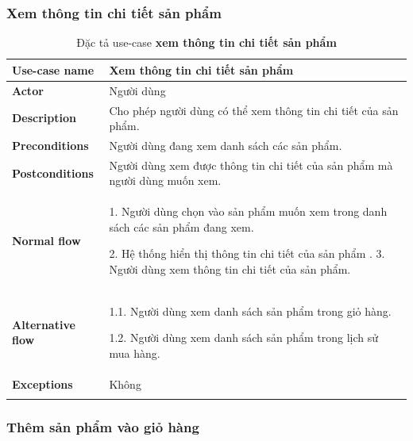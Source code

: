     \subsubsection{Xem thông tin chi tiết sản phẩm } 
         \begin{longtable}{| p{} | p{} |} 
    \hline
    \textbf{Use-case name} 
    & 
    Xem thông tin chi tiết sản phẩm
    \\
    \hline
    \textbf{Actor} 
    & 
    Người dùng
    \\
    \hline
    \textbf{Description} 
    & 
    Cho phép người dùng có thể xem thông tin chi tiết của sản phẩm.
    \\
    \hline
    \textbf{Preconditions} 
    &
    Người dùng đang xem danh sách các sản phẩm.
    \\
    \hline
    \textbf{Postconditions} 
    & 
    Người dùng xem được thông tin chi tiết của sản phẩm mà người dùng muốn xem.
    \\
    \hline
    \begin{flushleft}
    \textbf{Normal flow}
    \end{flushleft}
    & 
        1. Người dùng chọn vào sản phẩm muốn xem trong danh sách các sản phẩm đang xem.
        
        2. Hệ thống hiển thị thông tin chi tiết của sản phẩm
        .
        3. Người dùng xem thông tin chi tiết của sản phẩm.
    \\
    \hline
    \textbf{Alternative flow}
    & 
    1.1. Người dùng xem danh sách sản phẩm trong giỏ hàng.
    
    1.2. Người dùng xem danh sách sản phẩm trong lịch sử mua hàng.
    \\
    \hline
    \textbf{Exceptions} 
    &
    Không
    \\
    \hline
    \caption{Đặc tả use-case \textbf{xem thông tin chi tiết sản phẩm}}
    \end{longtable}
    \subsubsection{ Thêm sản phẩm vào giỏ hàng}    
            
